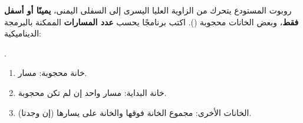 \begin{statement}
روبوت المستودع يتحرك من الزاوية العليا اليسرى إلى السفلى اليمنى، \textbf{يمينًا أو أسفل فقط}، وبعض الخانات محجوبة (). اكتب برنامجًا يحسب \textbf{عدد المسارات} الممكنة بالبرمجة الديناميكية: \par{\centering\small{}\par}.
\end{statement}
\begin{stepsbox}\begin{enumerate}
\item خانة محجوبة:  مسار.
\item خانة البداية: مسار واحد إن لم تكن محجوبة.
\item الخانات الأخرى: مجموع الخانة فوقها والخانة على يسارها (إن وجدتا).
\end{enumerate}\end{stepsbox}
